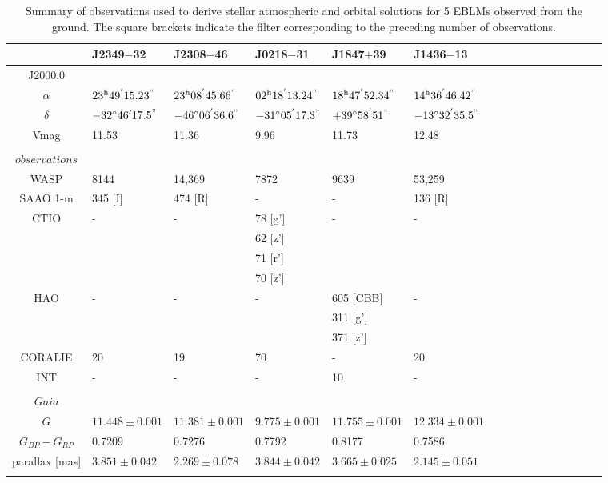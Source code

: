 \begin{table*}
\caption{Summary of observations used to derive stellar atmospheric and orbital solutions for 5 EBLMs observed from the ground. The square brackets indicate the filter corresponding to the preceding number of observations.}              %
\label{Observeration_table_ground}      %
\centering                                    %
\begin{tabular}{c l l  l l l l l l l l l l l l l }          %

\hline
\hline
 & J2349$-$32 & J2308$-$46 & J0218$-$31 & J1847$+$39 & J1436$-$13 \\
\hline
J2000.0 \\
$\alpha$  & $23^{\rm h}49^{'}15.23^{"}$ & $23^{\rm h}08^{'}45.66^{"}$ & $02^{\rm h}18^{'}13.24^{"}$ & $18^{\rm h}47^{'}52.34^{"}$ & $14^{\rm h}36^{'}46.42^{"}$\\
$\delta$ & $-32^{\circ}46' 17.5^{"}$ & $-46^{\circ}06^{'}36.6^{"}$  & $-31^{\circ}05^{'}17.3^{"}$ & $+39^{\circ}58^{'}51^{"}$ & $-13^{\circ}32^{'}35.5^{"}$\\
Vmag & 11.53 & 11.36 & 9.96 & 11.73 & 12.48\\
\\
$observations$ \\
WASP  & 8144 & 14,369 & 7872 & 9639 & 53,259 \\
SAAO 1-m  & 345 [I] & 474 [R]  & - & -  & 136 [R]\\
CTIO & - & - & 78 [g'] &- &- \\
& & & 62 [z'] \\
& & & 71 [r'] \\
& & & 70 [z'] \\
HAO  & - & - & - & 605 [CBB] & - \\
& & & & 311 [g'] \\
& & & & 371 [z'] \\
CORALIE & 20 & 19 & 70 & -& 20\\
INT & - & - & - &10 &-\\
\\
$Gaia$ \\
$G$
& $11.448 \pm 0.001$
& $11.381 \pm 0.001$
& $ 9.775 \pm 0.001$
& $11.755 \pm 0.001$
& $12.334 \pm 0.001$\\

$G_{BP} - G_{RP}$
& 0.7209
& 0.7276
& 0.7792
& 0.8177
& 0.7586 \\

parallax [mas]
& $3.851 \pm 0.042$ 
& $2.269 \pm 0.078$
& $3.844 \pm 0.042$
& $3.665 \pm 0.025$ 
& $2.145 \pm 0.051$\\\\


\end{tabular}
\end{table*}
